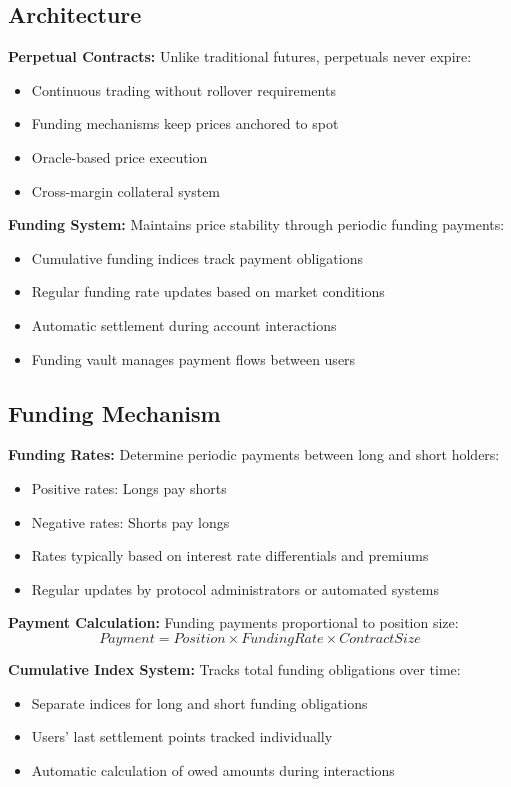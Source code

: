 \documentclass[12pt]{article}
\begin{document}
\begin{itemize}
\subsection{Architecture}

\textbf{Perpetual Contracts:} Unlike traditional futures, perpetuals never expire:
\begin{itemize}
    \item Continuous trading without rollover requirements
    \item Funding mechanisms keep prices anchored to spot
    \item Oracle-based price execution
    \item Cross-margin collateral system
\end{itemize}

\textbf{Funding System:} Maintains price stability through periodic funding payments:
\begin{itemize}
    \item Cumulative funding indices track payment obligations
    \item Regular funding rate updates based on market conditions
    \item Automatic settlement during account interactions
    \item Funding vault manages payment flows between users
\end{itemize}

\subsection{Funding Mechanism}

\textbf{Funding Rates:} Determine periodic payments between long and short holders:
\begin{itemize}
    \item Positive rates: Longs pay shorts
    \item Negative rates: Shorts pay longs
    \item Rates typically based on interest rate differentials and premiums
    \item Regular updates by protocol administrators or automated systems
\end{itemize}

\textbf{Payment Calculation:} Funding payments proportional to position size:
$$Payment = Position \times FundingRate \times ContractSize$$

\textbf{Cumulative Index System:} Tracks total funding obligations over time:
\begin{itemize}
    \item Separate indices for long and short funding obligations
    \item Users' last settlement points tracked individually
    \item Automatic calculation of owed amounts during interactions
\end{itemize}


\end{itemize}
\end{document}
